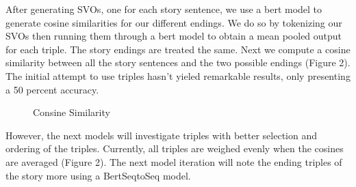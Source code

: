 \documentclass{article}
\begin{document}
\begin{multicols}{2}
After generating SVOs, one for each story sentence, we use a bert model to generate cosine similarities for our different endings. We do so by
tokenizing our SVOs then running them through a bert model to obtain a mean pooled output for each triple. The story endings are treated the same.
Next we compute a cosine similarity between all the story sentences and the two possible endings (Figure 2). The initial attempt to use triples hasn't yieled
 remarkable results, only presenting a 50 percent accuracy.

\begin{figure}[H]
    \centering
    \caption{Consine Similarity}
\end{figure}

However, the next models will investigate triples with better selection and ordering of the triples. Currently, all triples are weighed evenly 
when the cosines are averaged (Figure 2). The next model iteration will note the ending triples of the story more using a BertSeqtoSeq model. 

\end{multicols}
\end{document}

